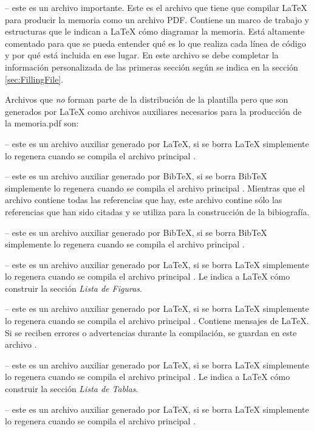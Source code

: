 -- este es un archivo importante. Este es el archivo que tiene que compilar \LaTeX{} para producir la memoria como un archivo PDF. Contiene un marco de trabajo y estructuras que le indican a \LaTeX{} cómo diagramar la memoria.  Está altamente comentado para que se pueda entender qué es lo que realiza cada línea de código y por qué está incluida en ese lugar.  En este archivo se debe completar la información personalizada de las primeras sección según se indica en la sección \ref{sec:FillingFile}.

Archivos que \emph{no} forman parte de la distribución de la plantilla pero que son generados por \LaTeX{} como archivos auxiliares necesarios para la producción de la memoria.pdf son:

 -- este es un archivo auxiliar generado por \LaTeX{}, si se borra \LaTeX{} simplemente lo regenera cuando se compila el archivo principal .

 -- este es un archivo auxiliar generado por BibTeX, si se borra BibTeX simplemente lo regenera cuando se compila el archivo principal . Mientras que el archivo  contiene todas las referencias que hay, este archivo  contine sólo las referencias que han sido citadas y se utiliza para la construcción de la bibiografía.

 -- este es un archivo auxiliar generado por BibTeX, si se borra BibTeX simplemente lo regenera cuando se compila el archivo principal .

 -- este es un archivo auxiliar generado por \LaTeX{}, si se borra \LaTeX{} simplemente lo regenera cuando se compila el archivo principal .  Le indica a \LaTeX{} cómo construir la sección \emph{Lista de Figuras}.
 
 --  este es un archivo auxiliar generado por \LaTeX{}, si se borra \LaTeX{} simplemente lo regenera cuando se compila el archivo principal . Contiene mensajes de \LaTeX{}. Si se reciben errores o advertencias durante la compilación, se guardan en este archivo .

 -- este es un archivo auxiliar generado por \LaTeX{}, si se borra \LaTeX{} simplemente lo regenera cuando se compila el archivo principal .  Le indica a \LaTeX{} cómo construir la sección \emph{Lista de Tablas}.

 -- este es un archivo auxiliar generado por \LaTeX{}, si se borra \LaTeX{} simplemente lo regenera cuando se compila el archivo principal .

